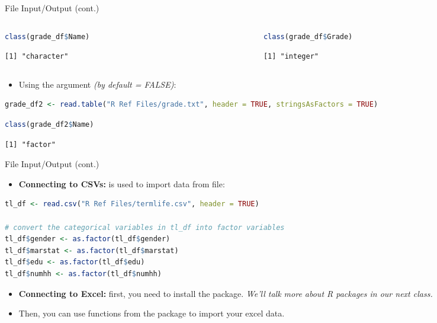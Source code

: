 \begin{frame}[fragile]{File Input/Output (cont.)}
\begin{columns}[T]
\begin{column}{0.48\textwidth}
\begin{lstlisting}[language=R]
class(grade_df$Name)
\end{lstlisting}
\begin{lstlisting}[style=output]
[1] "character"
\end{lstlisting}
\end{column}
\begin{column}{0.48\textwidth}
\begin{lstlisting}[language=R]
class(grade_df$Grade)
\end{lstlisting}
\begin{lstlisting}[style=output]
[1] "integer"
\end{lstlisting}
\end{column}
\end{columns}
\begin{itemize}
  \item Using the  argument \textit{(by default = FALSE)}:
\end{itemize}
\begin{lstlisting}[language=R]
grade_df2 <- read.table("R Ref Files/grade.txt", header = TRUE, stringsAsFactors = TRUE)
\end{lstlisting}
\begin{lstlisting}[language=R]
class(grade_df2$Name)
\end{lstlisting}
\begin{lstlisting}[style=output]
[1] "factor"
\end{lstlisting}
\end{frame}

\begin{frame}[fragile]{File Input/Output (cont.)}
\begin{itemize}
  \item \textbf{Connecting to CSVs:}  is used to import data from  file:
\end{itemize}
\begin{lstlisting}[language=R]
tl_df <- read.csv("R Ref Files/termlife.csv", header = TRUE)

# convert the categorical variables in tl_df into factor variables
tl_df$gender <- as.factor(tl_df$gender)
tl_df$marstat <- as.factor(tl_df$marstat)
tl_df$edu <- as.factor(tl_df$edu)
tl_df$numhh <- as.factor(tl_df$numhh)
\end{lstlisting}
\begin{itemize}
  \item \textbf{Connecting to Excel:} first, you need to install the  package. \textit{We’ll talk more about R packages in our next class.}
  \item Then, you can use functions from the package to import your excel data.
\end{itemize}
\end{frame}

